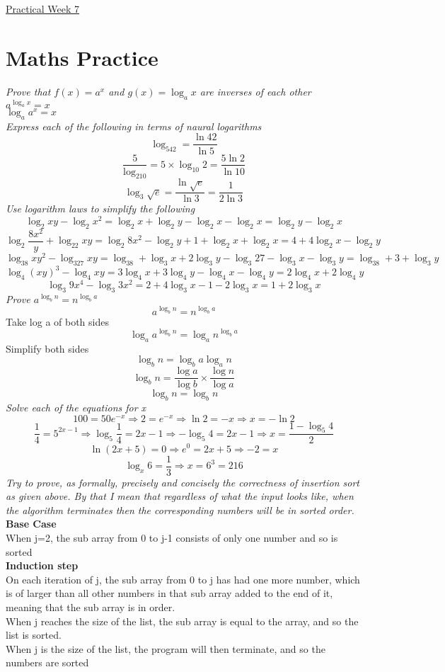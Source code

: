 \documentclass{article}[18pt]
\begin{document}
\begin{center}
\underline{\huge Practical Week 7}
\end{center}
\section{Maths Practice}
\textit{Prove that $f(x)=a^x$ and $g(x)=\log_ax$ are inverses of each other}\\
$a^{\log_ax}=x$\\
$\log_a{a^x}=x$\\
\textit{Express each of the following in terms of naural logarithms}
$$\log_542=\dfrac{\ln 42}{\ln 5}$$
$$\dfrac{5}{\log_210}=5\times \log_{10}2=\dfrac{5\ln 2}{\ln 10}$$
$$\log_3\sqrt{e}=\dfrac{\ln \sqrt{e}}{\ln 3}=\dfrac{1}{2\ln 3}$$
\textit{Use logarithm laws to simplify the following}
$$\log_2xy-\log_2x^2=\log_2x+\log_2y-\log_2x-\log_2x=\log_2y-\log_2x$$
$$\log_2\dfrac{8x^2}{y}+\log_22xy=\log_2 8x^2-\log_2y+1+\log_2x+\log_2x=4+4\log_2x-\log_2y$$
$$\log_38xy^2-\log_327xy=\log_38+\log_3x+2\log_3y-\log_3 27-\log_3x-\log_3y=\log_38+3+\log_3y$$
$$\log_4(xy)^3-\log_4xy=3\log_4x+3\log_4y-\log_4x-\log_4y=2\log_4x+2\log_4y$$
$$\log_3 9x^4-\log_3 3x^2=2+4\log_3x-1-2\log_3 x=1+2\log_3x$$
\textit{Prove $a^{\log_bn}=n^{\log_ba}$}
$$a^{\log_bn}=n^{\log_ba}$$
Take log a of both sides
$$\log_a a^{\log_bn}=\log_a n^{\log_ba}$$
Simplify both sides
$$\log_bn=\log_ba\log_an$$
$$\log_bn=\dfrac{\log a}{\log b}\times \dfrac{\log n}{\log a}$$
$$\log_bn=\log_bn$$
\textit{Solve each of the equations for x}
$$100=50e^{-x} \Rightarrow 2=e^{-x} \Rightarrow \ln 2=-x \Rightarrow x=-\ln 2$$
$$\frac{1}{4}=5^{2x-1} \Rightarrow \log_5 \frac{1}{4}=2x-1 \Rightarrow -\log_5 4=2x-1 \Rightarrow x=\dfrac{1-\log_5 4}{2}$$
$$\ln(2x+5)=0 \Rightarrow e^0=2x+5 \Rightarrow -2=x$$
$$\log_x6=\frac{1}{3}\Rightarrow x=6^3=216$$
\textit{Try to prove, as formally, precisely and concisely the correctness of insertion sort as given above. By that I mean that regardless of what the input looks like, when the algorithm terminates then the corresponding numbers will be in sorted order. }\\
\textbf{Base Case}\\
When j=2, the sub array from 0 to j-1 consists of only one number and so is sorted\\
\textbf{Induction step}\\
On each iteration of j, the sub array from 0 to j has had one more number, which is of larger than all other numbers in that sub array added to the end of it, meaning that the sub array is in order.\\
When j reaches the size of the list, the sub array is equal to the array, and so the list is sorted.\\
When j is the size of the list, the program will then terminate, and so the numbers are sorted 
\end{document}
